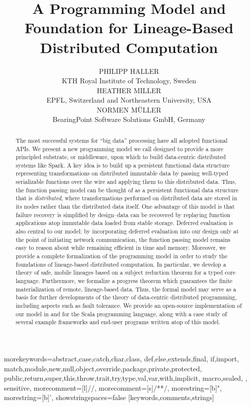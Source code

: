 \documentclass{jfp1}
\title[Journal of Functional Programming]{A Programming Model and Foundation for Lineage-Based Distributed Computation}
\author[P. Haller, H. Miller, and N. M{\"u}ller]{%
  PHILIPP HALLER\\ KTH Royal Institute of Technology, Sweden\\[1ex]%
  HEATHER MILLER\\ EPFL, Switzerland and Northeastern University, USA\\[1ex]%
  NORMEN M{\"U}LLER\\ BearingPoint Software Solutions GmbH, Germany}%
\begin{document}
\setmainfont[
  Ligatures=TeX,
  SmallCapsFont={TeX Gyre Termes},
  SmallCapsFeatures={Letters=SmallCaps},
]{Times New Roman}

%
{morekeywords={abstract,case,catch,char,class,%
    def,else,extends,final,%
    if,import,%
    match,module,new,null,object,override,package,private,protected,%
    public,return,super,this,throw,trait,try,type,val,var,with,implicit,%
    macro,sealed,%
  },%
  sensitive,%
  morecomment=[l]//,%
  morecomment=[s]{/*}{*/},%
  morestring=[b]",%
  morestring=[b]',%
  showstringspaces=false%
}[keywords,comments,strings]%

\setmonofont[Scale=0.8,BoldFont={Consolas Bold}]{Consolas}

\label{firstpage}

\maketitle

\begin{abstract}
  The most successful systems for ``big data'' processing have all
  adopted functional APIs. We present a new programming model we call
  {\em \FP} designed to provide a more principled substrate, or middleware, upon
  which to build data-centric distributed systems like Spark. A key idea is to build up a
  persistent functional data structure representing transformations on
  distributed immutable data by passing well-typed serializable
  functions over the wire and applying them to this distributed
  data. Thus, the function passing model can be thought of as a
  persistent functional data structure that is {\em distributed},
  where transformations performed on distributed data are stored in its nodes rather than
  the distributed data itself. One advantage of this model is that failure recovery
  is simplified by design--data can be recovered by replaying function applications atop
  immutable data loaded from stable storage. Deferred evaluation is
  also central to our model; by incorporating deferred evaluation into
  our design only at the point of initiating network communication,
  the function passing model remains easy to reason about while
  remaining efficient in time and memory. Moreover, we provide a
  complete formalization of the programming model in order to study
  the foundations of lineage-based distributed computation. In
  particular, we develop a theory of safe, mobile lineages based on a
  subject reduction theorem for a typed core language. Furthermore, we
  formalize a progress theorem which guarantees the finite materialization
  of remote, lineage-based data. Thus, the
  formal model may serve as a basis for further developments of the
  theory of data-centric distributed programming, including aspects
  such as fault tolerance. We provide an open-source implementation of
  our model in and for the Scala programming language, along with a
  case study of several example frameworks and end-user programs
  written atop of this model.
\end{abstract}
\end{document}
